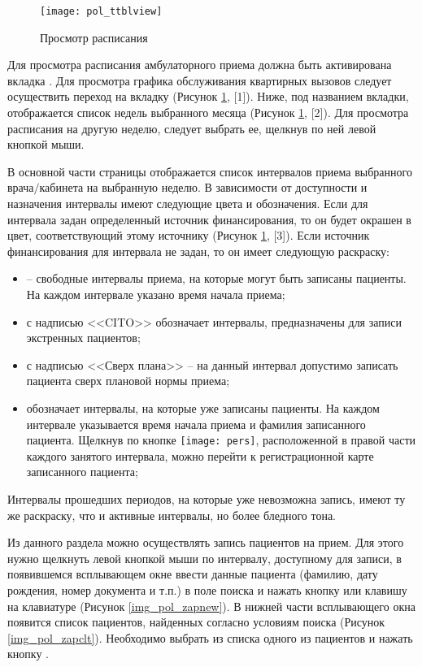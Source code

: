 \begin{figure}[ht]\centering
 \texttt{[image: pol\_ttblview]}
 \caption{Просмотр расписания}
 \label{img_pol_ttblview}
\end{figure}

Для просмотра расписания амбулаторного приема должна быть активирована вкладка . Для просмотра графика обслуживания квартирных вызовов следует осуществить переход на вкладку  (Рисунок \ref{img_pol_ttblview}, [1]). Ниже, под названием вкладки, отображается список недель выбранного месяца (Рисунок \ref{img_pol_ttblview}, [2]). Для просмотра расписания на другую неделю, следует выбрать ее, щелкнув по ней левой кнопкой мыши.

В основной части страницы отображается список интервалов приема выбранного врача$\slash$кабинета на выбранную неделю. В зависимости от доступности и назначения интервалы имеют следующие цвета и обозначения. Если для интервала задан определенный источник финансирования, то он будет окрашен в цвет, соответствующий этому источнику (Рисунок \ref{img_pol_ttblview}, [3]). Если источник финансирования для интервала не задан, то он имеет следующую раскраску:

\begin{itemize}
 \item {} -- свободные интервалы приема, на которые могут быть записаны пациенты. На каждом интервале указано время начала приема;
 \item {} с надписью <<CITO>> обозначает интервалы, предназначены для записи экстренных пациентов;
 \item {} с надписью <<Сверх плана>> -- на данный интервал допустимо записать пациента сверх плановой нормы приема;
 \item {} обозначает интервалы, на которые уже записаны пациенты. На каждом интервале указывается время начала приема и фамилия записанного пациента. Щелкнув по кнопке \texttt{[image: pers]}, расположенной в правой части каждого занятого интервала, можно перейти к регистрационной карте записанного пациента;
\end{itemize}

Интервалы прошедших периодов, на которые уже невозможна запись, имеют ту же раскраску, что и активные интервалы, но более бледного тона.

Из данного раздела можно осуществлять запись пациентов на прием. Для этого нужно щелкнуть левой кнопкой мыши по интервалу, доступному для записи, в появившемся всплывающем окне ввести данные пациента (фамилию, дату рождения, номер документа и т.п.) в поле поиска и нажать кнопку  или клавишу  на клавиатуре (Рисунок \ref{img_pol_zapnew}). В нижней части всплывающего окна появится список пациентов, найденных согласно условиям поиска (Рисунок \ref{img_pol_zapclt}). Необходимо выбрать из списка одного из пациентов и нажать кнопку .   

